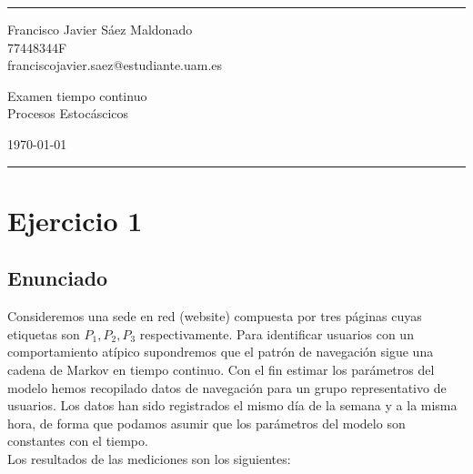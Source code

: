 \documentclass[a4paper]{article}
\begin{document}

\fancyhead[C]{}
\hrule \medskip %
\begin{minipage}{0.295\textwidth}
\raggedright
\footnotesize
Francisco Javier Sáez Maldonado \hfill\\
77448344F \hfill\\
franciscojavier.saez@estudiante.uam.es
\end{minipage}
\begin{minipage}{0.4\textwidth}
\centering
\large
Examen tiempo continuo\\
\normalsize
Procesos Estocáscicos\\
\end{minipage}
\begin{minipage}{0.295\textwidth}
\raggedleft
\today\hfill\\
\end{minipage}
\medskip\hrule
\bigskip



\section*{Ejercicio 1}

\subsection*{Enunciado}

Consideremos una sede en red (website) compuesta por tres páginas cuyas etiquetas son $P_{1}, P_{2}, P_{3}$ respectivamente. Para identiﬁcar usuarios con un comportamiento atípico supondremos que el patrón de navegación sigue una cadena de Markov en tiempo continuo. Con el ﬁn estimar los parámetros del modelo hemos recopilado datos de navegación para un grupo representativo de usuarios. Los datos han sido registrados el mismo día de la semana y a la misma hora, de forma que podamos asumir que los parámetros del modelo son constantes con el tiempo.\\

Los resultados de las mediciones son los siguientes:
\end{document}
